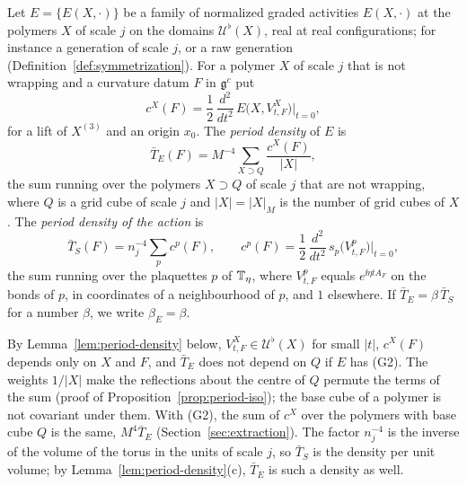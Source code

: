 \begin{definition}\label{def:period-density}
Let $E=\{E(X,\cdot)\}$ be a family of normalized graded activities $E(X,\cdot)$ at the polymers $X$ of scale $j$ on the domains $\mathcal U^\flat(X)$, real at real configurations; for instance a generation of scale $j$, or a raw generation (Definition~\ref{def:symmetrization}). For a polymer $X$ of scale $j$ that is not wrapping and a curvature datum $F$ in $\mathfrak g^c$ put
\[
c^X(F)=\frac12\,\frac{d^2}{dt^2}\,E\big(X,V^X_{t,F}\big)\Big|_{t=0},
\]
for a lift of $X^{(3)}$ and an origin $x_0$. The \emph{period density} of $E$ is
\[
\bar T_E(F)=M^{-4}\sum_{X\supset Q}\frac{c^X(F)}{|X|},
\]
the sum running over the polymers $X\supset Q$ of scale $j$ that are not wrapping, where $Q$ is a grid cube of scale $j$ and $|X|=|X|_M$ is the number of grid cubes of $X$. The \emph{period density of the action} is
\[
\bar T_S(F)=n_j^{-4}\sum_pc^p(F),\qquad c^p(F)=\frac12\,\frac{d^2}{dt^2}\,s_p\big(V^p_{t,F}\big)\Big|_{t=0},
\]
the sum running over the plaquettes $p$ of $\mathbb T_\eta$, where $V^p_{t,F}$ equals $e^{\ii\eta tA_F}$ on the bonds of $p$, in coordinates of a neighbourhood of $p$, and $1$ elsewhere. If $\bar T_E=\beta\,\bar T_S$ for a number $\beta$, we write $\beta_E=\beta$.
\end{definition}

By Lemma~\ref{lem:period-density} below, $V^X_{t,F}\in\mathcal U^\flat(X)$ for small $|t|$, $c^X(F)$ depends only on $X$ and $F$, and $\bar T_E$ does not depend on $Q$ if $E$ has (G2). The weights $1/|X|$ make the reflections about the centre of $Q$ permute the terms of the sum (proof of Proposition~\ref{prop:period-iso}); the base cube of a polymer is not covariant under them. With (G2), the sum of $c^X$ over the polymers with base cube $Q$ is the same, $M^4\bar T_E$ (Section~\ref{sec:extraction}). The factor $n_j^{-4}$ is the inverse of the volume of the torus in the units of scale $j$, so $\bar T_S$ is the density per unit volume; by Lemma~\ref{lem:period-density}(c), $\bar T_E$ is such a density as well.

